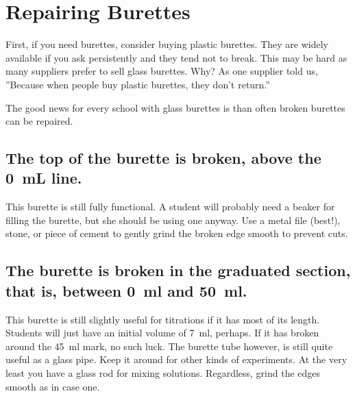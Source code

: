 \chapter{Repairing Burettes}
\label{cha:burettes}

First, if you need burettes, consider buying plastic burettes. They are widely available if you ask persistently and they tend not to break. This may be hard as many suppliers prefer to sell glass burettes. Why? As one supplier told us, ''Because when people buy plastic burettes, they don’t return.''

The good news for every school with glass burettes is than often broken burettes can be repaired.

\section{The top of the burette is broken, 
above the 0~mL line.}

This burette is still fully functional. 
A student will probably need a beaker for filling the burette, 
but she should be using one anyway. 
Use a metal file (best!), 
stone, 
or piece of cement to gently grind the broken edge smooth to prevent cuts.

\section{The burette is broken in the graduated section, 
that is, 
between 0~ml and 50~ml.}
This burette is still slightly useful for titrations 
if it has most of its length. 
Students will just have an initial volume of 7~ml, 
perhaps. 
If it has broken around the 45~ml mark, 
no such luck. 
The burette tube however, 
is still quite useful as a glass pipe. 
Keep it around for other kinds of experiments. 
At the very least you have a glass rod for mixing solutions. 
Regardless, 
grind the edges smooth as in case one.

